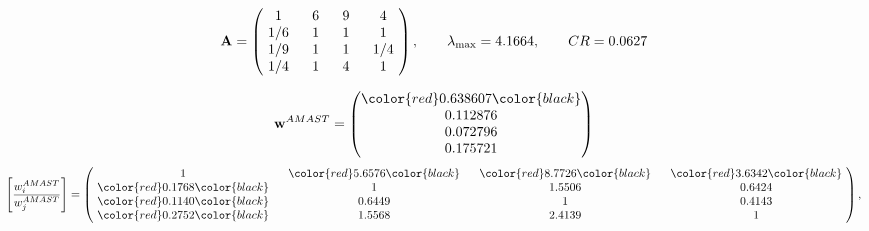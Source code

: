 \begin{example}
\begin{equation*}
\mathbf{A} =
\begin{pmatrix}
$\,\,$ 1 $\,\,$ & $\,\,$6$\,\,$ & $\,\,$9$\,\,$ & $\,\,$4 $\,\,$ \\
$\,\,$ 1/6$\,\,$ & $\,\,$ 1 $\,\,$ & $\,\,$1$\,\,$ & $\,\,$1 $\,\,$ \\
$\,\,$ 1/9$\,\,$ & $\,\,$ 1 $\,\,$ & $\,\,$ 1 $\,\,$ & $\,\,$ 1/4 $\,\,$ \\
$\,\,$ 1/4$\,\,$ & $\,\,$ 1 $\,\,$ & $\,\,$4$\,\,$ & $\,\,$ 1  $\,\,$ \\
\end{pmatrix},
\qquad
\lambda_{\max} =
4.1664,
\qquad
CR = 0.0627
\end{equation*}

\begin{equation*}
\mathbf{w}^{AMAST} =
\begin{pmatrix}
\color{red} 0.638607\color{black} \\
0.112876\\
0.072796\\
0.175721
\end{pmatrix}\end{equation*}
\begin{equation*}
\left[ \frac{{w}^{AMAST}_i}{{w}^{AMAST}_j} \right] =
\begin{pmatrix}
$\,\,$ 1 $\,\,$ & $\,\,$\color{red} 5.6576\color{black} $\,\,$ & $\,\,$\color{red} 8.7726\color{black} $\,\,$ & $\,\,$\color{red} 3.6342\color{black} $\,\,$ \\
$\,\,$\color{red} 0.1768\color{black} $\,\,$ & $\,\,$ 1 $\,\,$ & $\,\,$1.5506$\,\,$ & $\,\,$0.6424  $\,\,$ \\
$\,\,$\color{red} 0.1140\color{black} $\,\,$ & $\,\,$0.6449$\,\,$ & $\,\,$ 1 $\,\,$ & $\,\,$0.4143 $\,\,$ \\
$\,\,$\color{red} 0.2752\color{black} $\,\,$ & $\,\,$1.5568$\,\,$ & $\,\,$2.4139$\,\,$ & $\,\,$ 1  $\,\,$ \\
\end{pmatrix},
\end{equation*}


\end{example}
